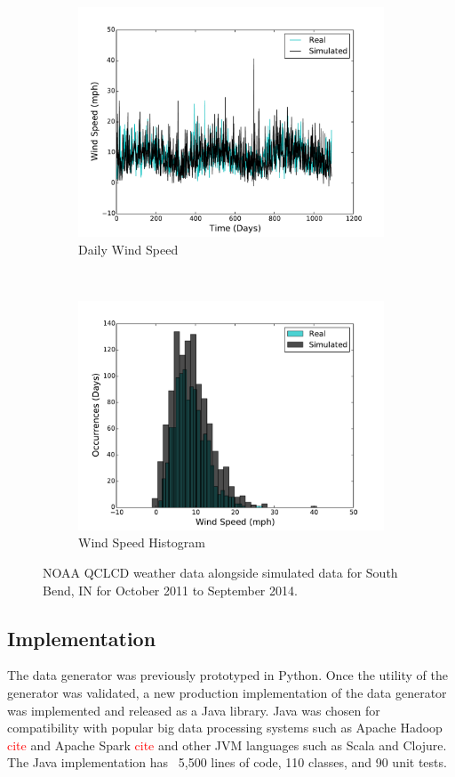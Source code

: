 \documentclass[conference]{IEEEtran}
\begin{document}
\begin{figure}[!t]
\begin{subfigure}[b]{0.4\textwidth}
    \includegraphics[width=\textwidth]{figures/daily_wind_speeds.pdf}
    \caption{Daily Wind Speed}
  \end{subfigure}
  ~
  \begin{subfigure}[b]{0.4\textwidth}
    \includegraphics[width=\textwidth]{figures/daily_wind_speed_hist.pdf}
    \caption{Wind Speed Histogram}
  \end{subfigure}

  \caption{NOAA QCLCD weather data alongside simulated data for South Bend, IN for October 2011 to September 2014.}
  \label{fig:weather_model}  
\end{figure}

\subsection{Implementation}
The data generator was previously prototyped in Python.  Once the utility of the generator was validated, a new production implementation of the data generator was implemented and released as a Java library. Java was chosen for compatibility with popular big data processing systems such as Apache Hadoop \textcolor{red}{cite} and Apache Spark \textcolor{red}{cite} and other JVM languages such as Scala and Clojure.  The Java implementation has ~5,500 lines of code, 110 classes, and 90 unit tests.
\end{document}
